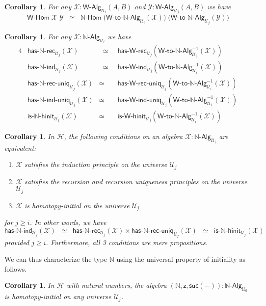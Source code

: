 \documentclass[11pt]{article}
\newcommand{\X}{\mathcal{X}}
\newcommand{\Y}{\mathcal{Y}}
\newcommand{\z}{\mathsf{z}}
\newcommand{\suc}{\mathsf{suc}}
\newcommand{\nat}{\ensuremath{\mathbb{N}}}
\newcommand{\W}{\mathsf{W}}
\newcommand{\UU}{\mathcal{U}}
\newcommand{\NatAlg}{\nat\text{-}\mathsf{Alg}}
\newcommand{\NatHom}{\nat\text{-}\mathsf{Hom}}
\newcommand{\HasNatRec}{\mathsf{has}\text{-}\nat\text{-}\mathsf{rec}}
\newcommand{\HasNatInd}{\mathsf{has}\text{-}\nat\text{-}\mathsf{ind}}
\newcommand{\HasNatRecUniq}{\mathsf{has}\text{-}\nat\text{-}\mathsf{rec}\text{-}\mathsf{uniq}}
\newcommand{\HasNatIndUniq}{\mathsf{has}\text{-}\nat\text{-}\mathsf{ind}\text{-}\mathsf{uniq}}
\newcommand{\IsNatHInit}{\mathsf{is}\text{-}\nat\text{-}\mathsf{hinit}}
\newcommand{\WAlgToNatAlg}{\W\text{-}\mathsf{to}\text{-}\nat\text{-}\mathsf{Alg}}
\newcommand{\WAlg}{\mathsf{W}\text{-}\mathsf{Alg}}
\newcommand{\WHom}{\mathsf{W}\text{-}\mathsf{Hom}}
\newcommand{\HasWRec}{\mathsf{has}\text{-}\mathsf{W}\text{-}\mathsf{rec}}
\newcommand{\HasWInd}{\mathsf{has}\text{-}\mathsf{W}\text{-}\mathsf{ind}}
\newcommand{\HasWRecUniq}{\mathsf{has}\text{-}\mathsf{W}\text{-}\mathsf{rec}\text{-}\mathsf{uniq}}
\newcommand{\HasWIndUniq}{\mathsf{has}\text{-}\mathsf{W}\text{-}\mathsf{ind}\text{-}\mathsf{uniq}}
\newcommand{\IsWHInit}{\mathsf{is}\text{-}\mathsf{\W}\text{-}\mathsf{hinit}}
\newcommand{\Hint}{\mathcal{H}}
\newtheorem{corollary}[theorem]{Corollary}
\theoremstyle{definition}
\begin{document}
\begin{corollary}
For any $\X : \WAlg_{\UU_i}(A,B)$ and $\Y : \WAlg_{\UU_j}(A,B)$ we have
\[ \WHom \; \X \; \Y \;\; \simeq \;\; \NatHom \; \big(\WAlgToNatAlg_{\UU_i}(\X)\big) \; \big(\WAlgToNatAlg_{\UU_j}(\Y)\big) \]
\end{corollary}

\begin{corollary}
For any $\X : \NatAlg_{\UU_i}$ we have
\begin{alignat*}{4}
& \HasNatRec_{\UU_j}(\X) & \;\; \simeq \;\; & \HasWRec_{\UU_j}(\WAlgToNatAlg_{\UU_i}^{-1}(\X)) \\
& \HasNatInd_{\UU_j}(\X) & \;\; \simeq \;\; & \HasWInd_{\UU_j}(\WAlgToNatAlg_{\UU_i}^{-1}(\X)) \\
& \HasNatRecUniq_{\UU_j}(\X) &  \simeq \;\; & \HasWRecUniq_{\UU_j}(\WAlgToNatAlg_{\UU_i}^{-1}(\X)) \\
& \HasNatIndUniq_{\UU_j}(\X) & \simeq \;\; &  \HasWIndUniq_{\UU_j}(\WAlgToNatAlg_{\UU_i}^{-1}(\X)) \\
& \IsNatHInit_{\UU_j}(\X) & \simeq \;\; & \IsWHInit_{\UU_j}(\WAlgToNatAlg_{\UU_i}^{-1}(\X))
\end{alignat*}
\end{corollary}

\begin{corollary}\label{lem:NatMainInt}
In $\Hint$, the following conditions on an algebra $\X : \NatAlg_{\UU_i}$ are equivalent:
\begin{enumerate}
\item $\X$ satisfies the induction principle on the universe $\UU_j$
\item $\X$ satisfies the recursion and recursion uniqueness principles on the universe $\UU_j$
\item $\X$ is homotopy-initial on the universe $\UU_j$  
\end{enumerate}
for $j \geq i$. In other words, we have \[ \HasNatInd_{\UU_j}(\X)  \;\; \simeq \;\; \HasNatRec_{\UU_j}(\X) \times \HasNatRecUniq_{\UU_j}(\X) \;\; \simeq \;\; \IsNatHInit_{\UU_j}(\X) \]
provided $j \geq i$. Furthermore, all 3 conditions are mere propositions.
\end{corollary}

We can thus characterize the type $\nat$ using the universal property of initiality as follows.
\begin{corollary}\label{lem:NatInitInt}
In $\Hint$ with natural numbers, the algebra $(\nat,\z,\suc(-)) : \NatAlg_{\UU_0}$ is homotopy-initial on any universe $\UU_j$.
\end{corollary}
\end{document}
